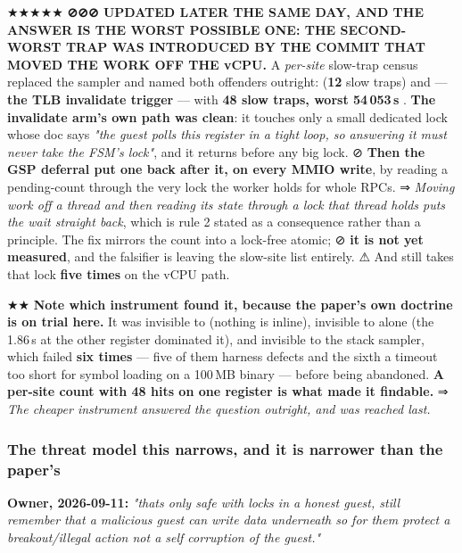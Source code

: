 \documentclass[10.5pt]{article}
\begin{document}
\begin{warnbox}
\smallskip
★★★★★ \textbf{⊘⊘⊘ UPDATED LATER THE SAME DAY, AND THE ANSWER IS THE WORST POSSIBLE ONE: THE
SECOND-WORST TRAP WAS INTRODUCED BY THE COMMIT THAT MOVED THE WORK OFF THE vCPU.} A \emph{per-site}
slow-trap census replaced the sampler and named both offenders outright: 
(\textbf{12} slow traps) and  --- \textbf{the TLB invalidate trigger} ---
with \textbf{48 slow traps, worst 54\,053\,\textmu s} \measured{} . \textbf{The
invalidate arm's own path was clean}: it touches only a small dedicated lock whose doc says
\emph{"the guest polls this register in a tight loop, so answering it must never take the FSM's
lock"}, and it returns before any big lock. ⊘ \textbf{Then the GSP deferral put one back after
it, on every MMIO write}, by reading a pending-count through the very lock the worker holds for
whole RPCs. ⇒ \emph{Moving work off a thread and then reading its state through a lock that
thread holds puts the wait straight back}, which is rule 2 stated as a consequence rather than a
principle. The fix mirrors the count into a lock-free atomic; ⊘ \textbf{it is not yet measured},
and the falsifier is  leaving the slow-site list entirely. ⚠ And
 still takes that lock \textbf{five times} on the vCPU path.

\smallskip
★★ \textbf{Note which instrument found it, because the paper's own doctrine is on trial here.} It
was invisible to  (nothing is inline), invisible to 
alone (the 1.86\,s at the other register dominated it), and invisible to the stack sampler, which
failed \textbf{six times} --- five of them harness defects and the sixth a timeout too short for
symbol loading on a 100\,MB binary --- before being abandoned. \textbf{A per-site count with 48
hits on one register is what made it findable.} ⇒ \emph{The cheaper instrument answered the
question outright, and was reached last.}
\end{warnbox}

\subsubsection*{The threat model this narrows, and it is narrower than the paper's}

\begin{claimbox}\small
\textbf{Owner, 2026-09-11:} \emph{"thats only safe with locks in a honest guest, still remember
that a malicious guest can write data underneath so for them protect a breakout/illegal action
not a self corruption of the guest."}
\end{claimbox}
\end{document}
